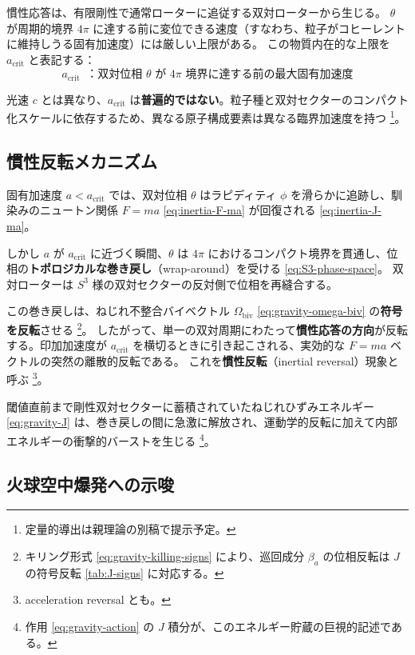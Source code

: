 \documentclass[dvipdfmx,a4paper,oneside]{jsbook}
\numberwithin{equation}{chapter}
\begin{document}
慣性応答は、有限剛性で通常ローターに追従する双対ローターから生じる。
\(\theta\) が周期的境界 \(4\pi\) に達する前に変位できる速度（すなわち、粒子がコヒーレントに維持しうる固有加速度）には厳しい上限がある。
この物質内在的な上限を \(a_{\mathrm{crit}}\) と表記する：
\begin{equation}
  \boxed{\;
  a_{\mathrm{crit}}
  \;\;\text{：双対位相 } \theta \text{ が } 4\pi \text{ 境界に達する前の最大固有加速度}
  \;}
  \label{eq:inertia-acrit}
\end{equation}

光速 \(c\) とは異なり、\(a_{\mathrm{crit}}\) は\textbf{普遍的ではない}。粒子種と双対セクターのコンパクト化スケールに依存するため、異なる原子構成要素は異なる臨界加速度を持つ \footnote{定量的導出は親理論の別稿で提示予定。}。

\subsection{慣性反転メカニズム}

固有加速度 \(a < a_{\mathrm{crit}}\) では、双対位相 \(\theta\) はラピディティ \(\phi\) を滑らかに追跡し、馴染みのニュートン関係 \(F = ma\) \eqref{eq:inertia-F-ma} が回復される \eqref{eq:inertia-J-ma}。

しかし \(a\) が \(a_{\mathrm{crit}}\) に近づく瞬間、\(\theta\) は \(4\pi\) におけるコンパクト境界を貫通し、位相の\textbf{トポロジカルな巻き戻し}（wrap-around）を受ける \eqref{eq:S3-phase-space}。
双対ローターは \(S^3\) 様の双対セクターの反対側で位相を再縫合する。

この巻き戻しは、ねじれ不整合バイベクトル \(\Omega_{\mathrm{biv}}\) \eqref{eq:gravity-omega-biv} の\textbf{符号を反転}させる \footnote{キリング形式 \eqref{eq:gravity-killing-signs} により、巡回成分 \(\beta_a\) の位相反転は \(J\) の符号反転 \eqref{tab:J-signs} に対応する。}。
したがって、単一の双対周期にわたって\textbf{慣性応答の方向}が反転する。印加加速度が \(a_{\mathrm{crit}}\) を横切るときに引き起こされる、実効的な \(F = ma\) ベクトルの突然の離散的反転である。
これを\textbf{慣性反転}（inertial reversal）現象と呼ぶ \footnote{acceleration reversal とも。}。

閾値直前まで剛性双対セクターに蓄積されていたねじれひずみエネルギー \eqref{eq:gravity-J} は、巻き戻しの間に急激に解放され、運動学的反転に加えて内部エネルギーの衝撃的バーストを生じる \footnote{作用 \eqref{eq:gravity-action} の \(J\) 積分が、このエネルギー貯蔵の巨視的記述である。}。

\subsection{火球空中爆発への示唆}
\end{document}
